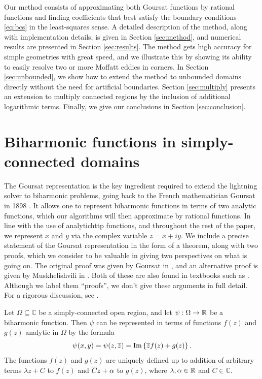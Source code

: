 \documentclass{article}
\begin{document}
Our method consists of approximating both Goursat functions by rational
functions and finding coefficients that best satisfy the boundary conditions
\eqref{eq:bcs} in the least-squares sense. A detailed description of the
method, along with implementation details, is given in Section
\ref{sec:method}, and numerical results are presented in Section
\ref{sec:results}. The method gets high accuracy for simple geometries with
great speed, and we illustrate this by showing its ability to easily resolve
two or more Moffatt eddies in corners. In Section \ref{sec:unbounded}, we show
how to extend the method to unbounded domains directly without the need for
artificial boundaries. Section  \ref{sec:multiply} presents an extension to
multiply connected regions by the inclusion of additional logarithmic terms.
Finally, we give our conclusions in Section \ref{sec:conclusion}.

\section{Biharmonic functions in simply-connected domains \label{sec:goursat}}

The Goursat representation is the key ingredient required to extend the
lightning solver to biharmonic problems, going back to the French mathematician
Goursat in 1898 \cite{goursat98}. It allows one to represent biharmonic
functions in terms of two analytic functions, which our algorithms will then
approximate by rational functions. In line with the use of analytichttp
functions, and throughout the rest of the paper, we represent $x$ and $y$ via
the complex variable $z = x + iy$. We include a precise statement of the
Goursat representation in the form of a theorem, along with two proofs, which
we consider to be valuable in giving two perspectives on what is going on. The
original proof was given by Goursat in \cite{goursat98}, and an alternative
proof is given by Muskhelishvili in \cite{musk19}. Both of these are also found
in textbooks such as \cite{carrier05,musk77}. Although we label them
``proofs'', we don’t give these arguments in full detail. For a rigorous
discussion, see \cite{musk77}.


\begin{theorem}
\label{th:goursat}
Let $\Omega\subseteq\mathbb{C}$ be a simply-connected open region, and let
$\psi : \Omega \to \mathbb{R}$ be a biharmonic function. Then $\psi$ can
be represented in terms of functions $f(z)$ and $g(z)$ analytic in $\Omega$
by the formula
\begin{equation}\label{eq:goursat}
\psi(x,y) = \psi(z,{\overline{z}}) = \Im \left\{ {\overline{z}}f(z) + g(z)\right\}.
\end{equation}
The functions $f(z)$ and $g(z)$ are uniquely defined up to addition of
arbitrary terms $\lambda z+C$ to $f(z)$ and ${\overline{C}}z+\alpha$ to $g(z)$,
where $\lambda,\alpha\in\mathbb{R}$ and $C\in\mathbb{C}$.
\end{theorem}
\end{document}

